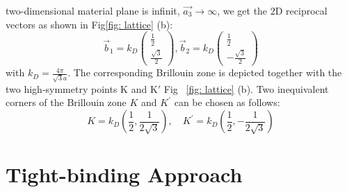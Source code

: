two-dimensional material plane is infinit, $\overrightarrow{a_{3}}\to\infty$, we get the $2 \mathrm{D}$ reciprocal vectors as shown in Fig\ref{fig: lattice} (b):
$$
	\vec b_{1}=k_{D}\left(\begin{array}{l}
			\frac{1}{2} \\
			\frac{\sqrt{3}}{2}
		\end{array}\right),
	\vec b_{2}=k_{D}\left(\begin{array}{c}
			\frac{1}{2} \\
			-\frac{\sqrt{3}}{2}
		\end{array}\right)
$$
with $k_{D}=\frac{4 \pi}{\sqrt{3} a}$. The corresponding Brillouin zone is depicted together with the two high-symmetry points $\mathrm{K}$ and $\mathrm{K'}$ Fig ~\ref{fig: lattice} (b).
Two inequivalent corners of the Brillouin zone $K$ and $K^{\prime}$ can be chosen as follows:
$$
	K=k_{D}\left(\frac{1}{2}, \frac{1}{2 \sqrt{3}}\right), \quad K^{\prime}=k_{D}\left(\frac{1}{2},-\frac{1}{2 \sqrt{3}}\right)
$$

\section{Tight-binding Approach \label{sec:tightbinding}}

